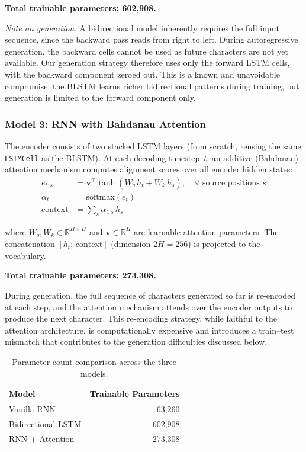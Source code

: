 \documentclass[12pt, a4paper]{article}
\begin{document}
\textbf{Total trainable parameters: 602,908.}

\textit{Note on generation:} A bidirectional model inherently requires the full input sequence, since the backward pass reads from right to left. During autoregressive generation, the backward cells cannot be used as future characters are not yet available. Our generation strategy therefore uses only the forward LSTM cells, with the backward component zeroed out. This is a known and unavoidable compromise: the BLSTM learns richer bidirectional patterns during training, but generation is limited to the forward component only.

\subsubsection{Model 3: RNN with Bahdanau Attention}

The encoder consists of two stacked LSTM layers (from scratch, reusing the same \texttt{LSTMCell} as the BLSTM). At each decoding timestep~$t$, an additive (Bahdanau) attention mechanism computes alignment scores over all encoder hidden states:
\begin{align}
  e_{t,s} &= \mathbf{v}^\top \tanh(W_q\, h_t + W_k\, h_s), \quad \forall \text{ source positions } s \\
  \alpha_t &= \mathrm{softmax}(e_t) \\
  \mathrm{context} &= \textstyle\sum_s \alpha_{t,s}\, h_s
\end{align}

where $W_q, W_k \in \mathbb{R}^{H \times H}$ and $\mathbf{v} \in \mathbb{R}^{H}$ are learnable attention parameters. The concatenation $[h_t;\, \mathrm{context}]$ (dimension $2H = 256$) is projected to the vocabulary.

\textbf{Total trainable parameters: 273,308.}

During generation, the full sequence of characters generated so far is re-encoded at each step, and the attention mechanism attends over the encoder outputs to produce the next character. This re-encoding strategy, while faithful to the attention architecture, is computationally expensive and introduces a train--test mismatch that contributes to the generation difficulties discussed below.

\begin{table}[H]
\centering
\caption{Parameter count comparison across the three models.}
\label{tab:param_counts}
\begin{tabular}{lr}
\toprule
\textbf{Model} & \textbf{Trainable Parameters} \\
\midrule
Vanilla RNN        &  63,260 \\
Bidirectional LSTM & 602,908 \\
RNN + Attention    & 273,308 \\
\bottomrule
\end{tabular}
\end{table}
\end{document}
